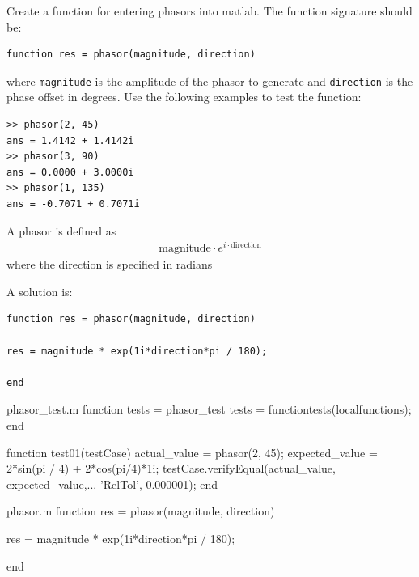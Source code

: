 \begin{ex}
Create a function for entering phasors into matlab.
The function signature should be:
\begin{lstlisting}
function res = phasor(magnitude, direction)
\end{lstlisting}
where \verb!magnitude! is the amplitude of the 
phasor to generate and \verb!direction! is the phase offset
in degrees.
Use the following examples to test the function:
\begin{lstlisting}
>> phasor(2, 45)
ans = 1.4142 + 1.4142i
>> phasor(3, 90)
ans = 0.0000 + 3.0000i
>> phasor(1, 135)
ans = -0.7071 + 0.7071i
\end{lstlisting}
\begin{hint}
A phasor is defined as 
\begin{align*}
\textrm{magnitude} \cdot e^{i \cdot \textrm{direction}}
\end{align*}
where the direction is specified in radians
\end{hint}
\begin{sol}
A solution is:
\begin{lstlisting}
function res = phasor(magnitude, direction)

res = magnitude * exp(1i*direction*pi / 180);

end\end{lstlisting}
\end{sol}
\begin{solutionfile}{phasor_test.m}
function tests = phasor_test
    tests = functiontests(localfunctions);
end


function test01(testCase)
    actual_value = phasor(2, 45);
    expected_value = 2*sin(pi / 4) + 2*cos(pi/4)*1i;
    testCase.verifyEqual(actual_value, expected_value,...
        'RelTol', 0.000001);
end
\end{solutionfile}
\begin{solutionfile}{phasor.m}
function res = phasor(magnitude, direction)

res = magnitude * exp(1i*direction*pi / 180);

end
\end{solutionfile}
\end{ex}


